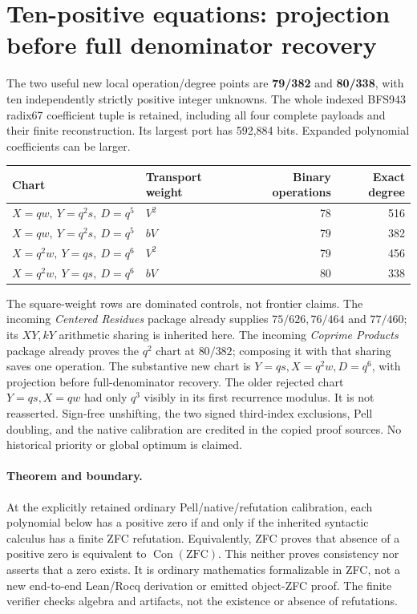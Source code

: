\section{Ten-positive equations: projection before full denominator recovery}
\label{sec:compact}
The two useful new local operation/degree points are \textbf{79/382} and
\textbf{80/338}, with ten independently strictly positive integer unknowns.
The whole indexed BFS943 radix67 coefficient tuple is retained, including all
four complete payloads and their finite reconstruction. Its largest port has
592,884 bits. Expanded polynomial coefficients can be larger.

\begin{center}
\begin{tabular}{llrr}
Chart & Transport weight & Binary operations & Exact degree\\\hline
$X=qw,\ Y=q^2s,\ D=q^5$ & $V^2$ &78&516\\
$X=qw,\ Y=q^2s,\ D=q^5$ & $bV$ &79&382\\
$X=q^2w,\ Y=qs,\ D=q^6$ & $V^2$ &79&456\\
$X=q^2w,\ Y=qs,\ D=q^6$ & $bV$ &80&338
\end{tabular}
\end{center}
The square-weight rows are dominated controls, not frontier claims. The
incoming \emph{Centered Residues} package already supplies $75/626,76/464$
and $77/460$; its $XY,kY$ arithmetic sharing is inherited here. The incoming
\emph{Coprime Products} package already proves the $q^2$ chart at $80/382$;
composing it with that sharing saves one operation. The substantive new chart
is $Y=qs,X=q^2w,D=q^6$, with projection before full-denominator recovery.
The older rejected chart $Y=qs,X=qw$ had only $q^3$ visibly in its first
recurrence modulus. It is not reasserted. Sign-free unshifting, the two signed
third-index exclusions, Pell doubling, and the native calibration are credited
in the copied proof sources. No historical priority or global optimum is claimed.

\paragraph{Theorem and boundary.}
At the explicitly retained ordinary Pell/native/refutation calibration,
each polynomial below has a positive zero if and only if the inherited
syntactic calculus has a finite ZFC refutation. Equivalently, ZFC proves that
absence of a positive zero is equivalent to $\operatorname{Con}(\mathrm{ZFC})$.
This neither proves consistency nor asserts that a zero exists. It is ordinary
mathematics formalizable in ZFC, not a new end-to-end Lean/Rocq derivation or
emitted object-ZFC proof. The finite verifier checks algebra and artifacts,
not the existence or absence of refutations.

